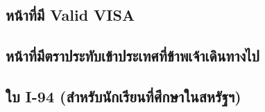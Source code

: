 \documentclass[a4paper,13pt]{article}
\begin{document}
\subsection{หน้าที่มี Valid VISA}
% 
% 

\newpage
\subsection{หน้าที่มีตราประทับเข้าประเทศที่ข้าพเจ้าเดินทางไป}
% 
% 

\newpage
\subsection{ใบ I-94 (สำหรับนักเรียนที่ศึกษาในสหรัฐฯ)}
% 
% 
\end{document}
